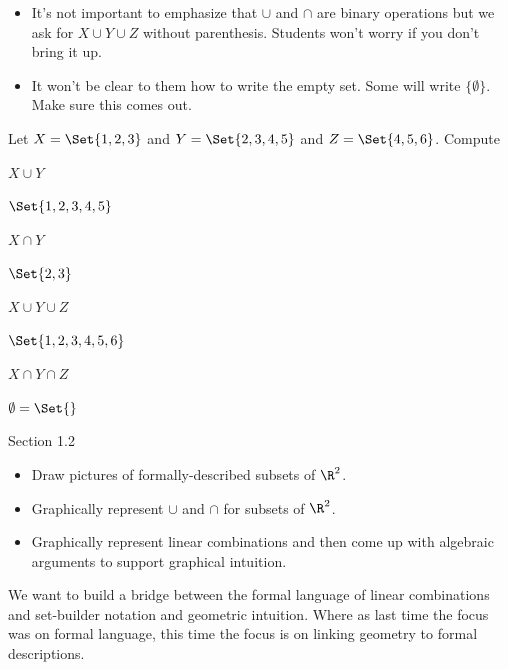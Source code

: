 \documentclass{problemset}
\begin{document}
	\question
	\begin{annotation}
		\begin{goals}
		\end{goals}

		\begin{notes}
			\begin{itemize}
				\item It's not important to emphasize that $\cup$ and $\cap$ are binary
			operations but we ask for $X\cup Y\cup Z$ without parenthesis.
			Students won't worry if you don't bring it up.
				\item It won't be clear to them how to write the empty set.
					Some will write $\{\emptyset\}$. Make sure this comes out.
			\end{itemize}
		\end{notes}
	\end{annotation}
	Let $X=\Set{1,2,3}$ and $Y=\Set{2,3,4,5}$ and $Z=\Set{4,5,6}$.  Compute
	\begin{parts}
		\item $X\cup Y$ \begin{solution}[inline]$\Set{1,2,3,4,5}$\end{solution}
		\item $X\cap Y$ \begin{solution}[inline]$\Set{2,3}$\end{solution}
		\item $X\cup Y\cup Z$ \begin{solution}[inline]$\Set{1,2,3,4,5,6}$\end{solution}
		\item $X\cap Y\cap Z$ \begin{solution}[inline]$\emptyset=\Set{}$\end{solution}
	\end{parts}


\begin{lesson}
	\newpage

	Section 1.2

	\begin{itemize}
		\item Draw pictures of formally-described subsets of $\R^2$.
		\item Graphically represent $\cup$ and $\cap$ for subsets of $\R^2$.
		\item Graphically represent linear combinations and then come up with
			algebraic arguments to support graphical intuition.
	\end{itemize}


	We want to build a bridge between the formal language of linear combinations
	and set-builder notation and geometric intuition. Where as last time
	the focus was on formal language, this time the focus is on linking geometry
	to formal descriptions.


	\newpage
\end{lesson}
\end{document}
